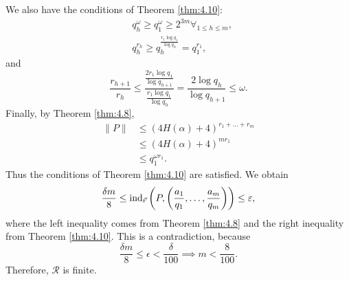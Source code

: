 \documentclass{Vorlesungstemplate_English} %
\begin{document}
\begin{pf}
  We also have the conditions of Theorem \ref{thm:4.10}:
  \begin{align*}
    &q_h^\omega\geq q_1^\omega\geq 2^{3m} \forall_{1 \leq h \leq m}, \\
    &q_h^{r_h}\geq q_h^{\frac{r_1\log q_1}{\log q_h}}=q_1^{r_1},
  \end{align*}
  and
  \[
    \frac{r_{h+1}}{r_h}
    \leq
    \frac{\frac{2r_1\log q_1}{\log q_{h+1}}}{\frac{r_1\log q_1}{\log q_h}}
    =
    \frac{2\log q_h}{\log q_{h+1}}
    \leq \omega.
  \]
  Finally, by Theorem \ref{thm:4.8},
  \begin{align*}
    \|P\|
    &\leq (4H(\alpha)+4)^{r_1+\dots+r_m} \\
    &\leq (4H(\alpha)+4)^{mr_1} \\
    &\leq q_1^{\omega r_1}.
  \end{align*}
  Thus the conditions of Theorem \ref{thm:4.10} are satisfied. We obtain
  \[
    \frac{\delta m}{8}
    \leq
    \text{ind}_{\vec r}\left(P,\left(\frac{a_1}{q_1},\dots,\frac{a_m}{q_m}\right)\right)
    \leq \varepsilon,
  \]
  where the left inequality comes from Theorem \ref{thm:4.8} and the right inequality from Theorem \ref{thm:4.10}. This is a contradiction, because
  \[
    \frac{\delta m}{8}\leq \epsilon<\frac{\delta}{100}
    \implies m<\frac{8}{100}.
  \]
  Therefore, $\mathcal R$ is finite.
\end{pf}
\end{document}
